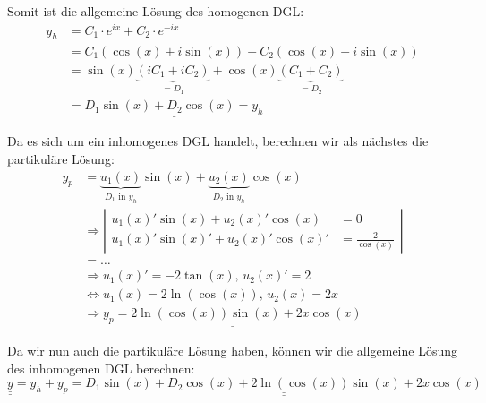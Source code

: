 Somit ist die allgemeine Lösung des homogenen DGL:
\begin{align*}
y_h &= C_1 \cdot e^{ix} + C_2 \cdot e^{-ix}\\
&= C_1 (\cos(x) + i\sin(x)) + C_2(\cos(x) - i\sin(x))\\
&= \sin(x) \underbrace{(i C_1 + i C_2)}_{ = D_1} + \cos(x) \underbrace{(C_1 + C_2)}_{= D_2}\\
&= \underline{D_1 \sin(x) + D_2 \cos(x) = y_h}
\end{align*}

Da es sich um ein inhomogenes DGL handelt, berechnen wir als nächstes die partikuläre
Lösung:
\begin{align*}
y_p &= \underbrace{u_1(x)}_{D_1 \text{ in } y_h} \sin(x) + \underbrace{u_2(x)}_{D_2 \text{ in } y_h} \cos(x)\\
&\Rightarrow \left|
	\begin{aligned}
		u_1(x)' \sin(x) + u_2(x)' \cos(x) &= 0\\
		u_1(x)' \sin(x)' + u_2(x)' \cos(x)' &= \frac{2}{\cos(x)}
	\end{aligned}
\right|\\
&= \ldots\\
&\Rightarrow u_1(x)' = -2 \tan(x),\, u_2(x)' = 2\\
&\Leftrightarrow u_1(x) = 2 \ln(\cos(x)),\, u_2(x) = 2x\\
&\Rightarrow \underline{y_p = 2 \ln(\cos(x)) \sin(x) + 2x \cos(x)}
\end{align*}

Da wir nun auch die partikuläre Lösung haben, können wir die allgemeine Lösung
des inhomogenen DGL berechnen:
$\underline{\underline{y}} = y_h + y_p = \underline{\underline{D_1 \sin(x) + D_2 \cos(x) + 2 \ln(\cos(x)) \sin(x) + 2x \cos(x)}}$
